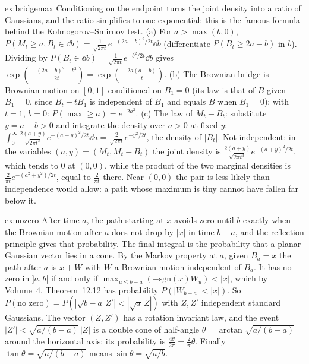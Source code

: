 \begin{solution}{ex:bridgemax}
\idea Conditioning on the endpoint turns the joint density into a ratio of Gaussians, and the ratio simplifies to one exponential: this is the famous formula behind the Kolmogorov--Smirnov test.
\writeup (a) For $a>\max(b,0)$, $P(M_t\ge a,B_t\in\dd b)=\frac{1}{\sqrt{2\pi t}}e^{-(2a-b)^2/2t}\dd b$ (differentiate $P(B_t\ge2a-b)$ in $b$). Dividing by $P(B_t\in\dd b)=\frac1{\sqrt{2\pi t}}e^{-b^2/2t}\dd b$ gives
$\exp(-\frac{(2a-b)^2-b^2}{2t})=\exp(-\frac{2a(a-b)}t)$. (b) The Brownian bridge is Brownian motion on $[0,1]$ conditioned on $B_1=0$ (its law is that of $B$ given $B_1=0$, since $B_t-tB_1$ is independent of $B_1$ and equals $B$ when $B_1=0$); with $t=1$, $b=0$: $P(\max\ge a)=e^{-2a^2}$. (c) The law of $M_t-B_t$: substitute $y=a-b>0$ and integrate the density over $a>0$ at fixed $y$: $\int_0^\infty\frac{2(a+y)}{\sqrt{2\pi t^3}}e^{-(a+y)^2/2t}\dd a=\frac2{\sqrt{2\pi t}}e^{-y^2/2t}$, the density of $|B_t|$. Not independent: in the variables $(a,y)=(M_t,M_t-B_t)$ the joint density is $\frac{2(a+y)}{\sqrt{2\pi t^3}}e^{-(a+y)^2/2t}$, which tends to $0$ at $(0,0)$, while the product of the two marginal densities is
$\frac2{\pi t}e^{-(a^2+y^2)/2t}$, equal to $\frac2{\pi t}$ there. Near $(0,0)$ the pair is less likely than independence would allow: a path whose maximum is tiny cannot have fallen far below it.
\end{solution}

\begin{solution}{ex:nozero}
\idea After time $a$, the path starting at $x$ avoids zero until $b$ exactly when the Brownian motion after $a$ does not drop by $|x|$ in time $b-a$, and the reflection principle gives that probability. The final
integral is the probability that a planar Gaussian vector lies in a cone.
\writeup By the Markov property at $a$, given $B_a=x$ the path after $a$ is $x+W$ with $W$ a Brownian motion independent of $B_a$. It has no zero in $]a,b[$ if and only if $\max_{u\le b-a}(-\mathrm{sgn}(x)W_u)<|x|$, which by
Volume~4, Theorem~12.12 has probability $P(|W_{b-a}|<|x|)$. So $P(\text{no zero})=P(|\sqrt{b-a}\,Z'|<|\sqrt a\,Z|)$ with $Z,Z'$ independent standard Gaussians. The vector $(Z,Z')$ has a rotation invariant law, and the event
$|Z'|<\sqrt{a/(b-a)}\,|Z|$ is a double cone of half-angle $\theta=\arctan\sqrt{a/(b-a)}$ around the horizontal axis; its probability is $\frac{4\theta}{2\pi}=\frac2\pi\theta$. Finally $\tan\theta=\sqrt{a/(b-a)}$ means $\sin\theta=\sqrt{a/b}$.
\end{solution}

